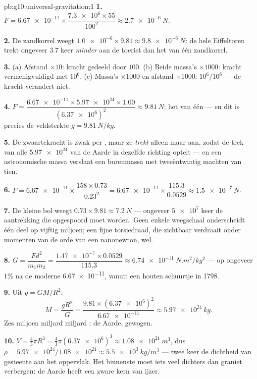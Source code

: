 \begin{solution}{pb:g10:universal-gravitation:1}
\textbf{1.} $F = \num{6.67e-11} \times
\dfrac{\num{7.3e6} \times 55}{100^2} \approx \qty{2.7e-6}{N}$.

\textbf{2.} De zandkorrel weegt
$\num{1.0e-6} \times 9.81 \approx \qty{9.8e-6}{N}$: de hele Eiffeltoren
trekt ongeveer $3.7$ keer \emph{minder} aan de toerist dan het 
van één zandkorrel.

\textbf{3.} (a) Afstand $\times 10$: kracht gedeeld door $100$.
(b) Beide massa's $\times 1000$: kracht vermenigvuldigd met $10^6$.
(c) Massa's $\times 1000$ en afstand $\times 1000$: $10^6 / 10^6$ ---
de kracht verandert niet.

\textbf{4.} $F = \dfrac{\num{6.67e-11} \times \num{5.97e24} \times
1.00}{(\num{6.37e6})^2} \approx \qty{9.81}{N}$: het  van één
 --- en dit is precies de veldsterkte $g = \qty{9.81}{N/kg}$.

\textbf{5.} De zwaartekracht is zwak per , maar ze
\emph{trekt} alleen maar aan, zodat de trek van alle $\num{5.97e24}$
 van de Aarde in dezelfde richting optelt --- en een
astronomische massa verslaat een burenmassa met tweeëntwintig machten
van tien.

\textbf{6.} $F = \num{6.67e-11} \times \dfrac{158 \times 0.73}{0.23^2}
= \num{6.67e-11} \times \dfrac{115.3}{0.0529}
\approx \qty{1.5e-7}{N}$.

\textbf{7.} De kleine bol weegt
$0.73 \times 9.81 \approx \qty{7.2}{N}$ --- ongeveer $\num{5e7}$ keer
de aantrekking die opgespoord moet worden. Geen enkele weegschaal
onderscheidt één deel op vijftig miljoen; een fijne torsiedraad, die
zichtbaar verdraait onder momenten van de orde van een nanonewton, wel.

\textbf{8.} $G = \dfrac{F d^2}{m_1 m_2}
= \dfrac{\num{1.47e-7} \times 0.0529}{115.3}
\approx \qty{6.74e-11}{N.m^2/kg^2}$ --- op ongeveer $1\%$ na de moderne
\num{6.67e-11}, vanuit een houten schuurtje in 1798.

\textbf{9.} Uit $g = G M / R^2$:
\[
M = \frac{g R^2}{G}
= \frac{9.81 \times (\num{6.37e6})^2}{\num{6.67e-11}}
\approx \qty{5.97e24}{kg}.
\]
Zes miljoen miljard miljard : de Aarde, gewogen.

\textbf{10.} $V = \frac43 \pi R^3 = \frac43 \pi
(\num{6.37e6})^3 \approx \qty{1.08e21}{m^3}$, dus
$\rho = \num{5.97e24}/\num{1.08e21} \approx \qty{5.5e3}{kg/m^3}$ ---
twee keer de dichtheid van gesteente aan het oppervlak. Het binnenste
moet iets veel dichters dan graniet verbergen: de Aarde heeft een zware
kern van ijzer.


\end{solution}
